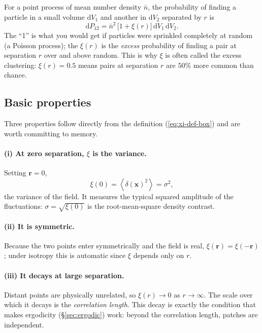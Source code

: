 \documentclass[12pt]{article}
\newcommand{\bx}{\mathbf{x}}
\newcommand{\br}{\mathbf{r}}
\newcommand{\avg}[1]{\left\langle #1 \right\rangle}
\begin{document}
For a point process of mean number density $\bar n$, the
probability of finding a particle in a small volume $\mathrm dV_1$ and
another in $\mathrm dV_2$ separated by $r$ is
\begin{equation}
  \mathrm dP_{12} = \bar n^2\,\bigl[1 + \xi(r)\bigr]\,\mathrm dV_1\,\mathrm dV_2 .
  \label{eq:xi-pair}
\end{equation}
The ``1'' is what you would get if particles were sprinkled completely
at random (a Poisson process); the $\xi(r)$ is the \emph{excess}
probability of finding a pair at separation $r$ over and above random.
This is why $\xi$ is often called the excess clustering: $\xi(r) = 0.5$
means pairs at separation $r$ are $50\%$ more common than chance.

\subsection{Basic properties}
\label{sec:xi-props}

Three properties follow directly from the definition
(\ref{eq:xi-def-box}) and are worth committing to memory.

\paragraph{(i) At zero separation, $\xi$ is the variance.}
Setting $\br = 0$,
\begin{equation}
  \xi(0) = \avg{\delta(\bx)^2} = \sigma^2 ,
  \label{eq:xi-zero}
\end{equation}
the variance of the field.  It measures the typical squared amplitude of
the fluctuations: $\sigma = \sqrt{\xi(0)}$ is the root-mean-square
density contrast.

\paragraph{(ii) It is symmetric.}
Because the two points enter symmetrically and the field is real,
$\xi(\br) = \xi(-\br)$; under isotropy this is automatic since $\xi$
depends only on $r$.

\paragraph{(iii) It decays at large separation.}
Distant points are physically unrelated, so $\xi(r) \to 0$ as $r \to
\infty$.  The scale over which it decays is the \emph{correlation
length}.  This decay is exactly the condition that makes ergodicity
(\S\ref{sec:ergodic}) work: beyond the correlation length, patches are
independent.
\end{document}
